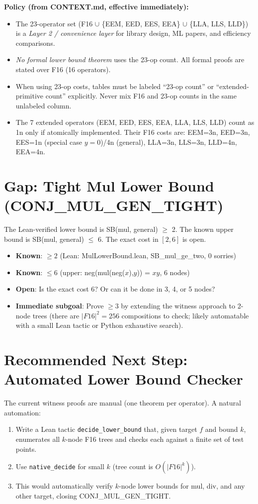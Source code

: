 \documentclass[11pt]{article}
\begin{document}
\textbf{Policy (from CONTEXT.md, effective immediately):}

\begin{itemize}
\item The 23-operator set (F16 $\cup$ \{EEM, EED, EES, EEA\} $\cup$ \{LLA, LLS, LLD\})
  is a \emph{Layer 2 / convenience layer} for library design, ML papers, and
  efficiency comparisons.
\item \emph{No formal lower bound theorem} uses the 23-op count. All formal
  proofs are stated over F16 (16 operators).
\item When using 23-op costs, tables must be labeled ``23-op count'' or
  ``extended-primitive count'' explicitly. Never mix F16 and 23-op counts in
  the same unlabeled column.
\item The 7 extended operators (EEM, EED, EES, EEA, LLA, LLS, LLD) count as
  1n only if atomically implemented. Their F16 costs are:
  EEM=3n, EED=3n, EES=1n (special case $y=0$)/4n (general),
  LLA=3n, LLS=3n, LLD=4n, EEA=4n.
\end{itemize}

\section{Gap: Tight Mul Lower Bound (CONJ\_MUL\_GEN\_TIGHT)}

The Lean-verified lower bound is SB(mul, general) $\geq$ 2.
The known upper bound is SB(mul, general) $\leq$ 6.
The exact cost in $[2, 6]$ is open.

\begin{itemize}
\item \textbf{Known}: $\geq 2$ (Lean: MulLowerBound.lean, SB\_mul\_ge\_two, 0 sorries)
\item \textbf{Known}: $\leq 6$ (upper: neg(mul(neg($x$),$y$)) = $xy$, 6 nodes)
\item \textbf{Open}: Is the exact cost 6? Or can it be done in 3, 4, or 5 nodes?
\item \textbf{Immediate subgoal}: Prove $\geq 3$ by extending the witness approach
  to 2-node trees (there are $|F16|^2 = 256$ compositions to check; likely
  automatable with a small Lean tactic or Python exhaustive search).
\end{itemize}

\section{Recommended Next Step: Automated Lower Bound Checker}

The current witness proofs are manual (one theorem per operator). A natural automation:

\begin{enumerate}
\item Write a Lean tactic \texttt{decide\_lower\_bound} that, given target $f$
  and bound $k$, enumerates all $k$-node F16 trees and checks each against
  a finite set of test points.
\item Use \texttt{native\_decide} for small $k$ (tree count is $O(|F16|^k)$).
\item This would automatically verify $k$-node lower bounds for mul, div, and
  any other target, closing CONJ\_MUL\_GEN\_TIGHT.
\end{enumerate}
\end{document}
